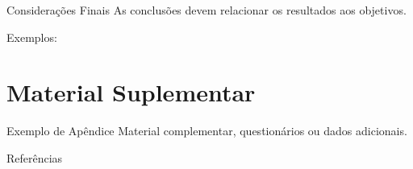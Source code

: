 \documentclass[aspectratio=169]{beamer}
\begin{document}
\begin{frame}{Considerações Finais}
As conclusões devem relacionar os resultados aos objetivos.

Exemplos:
\end{frame}

\appendix
\renewcommand{\thesection}{Apêndice \Alph{section}}

\section{Material Suplementar}

\begin{frame}{Exemplo de Apêndice}\label{sec:apendiceA}
Material complementar, questionários ou dados adicionais.
\end{frame}

\begin{frame}[allowframebreaks]{Referências}
\printbibliography[heading=none]
\end{frame}
\end{document}
